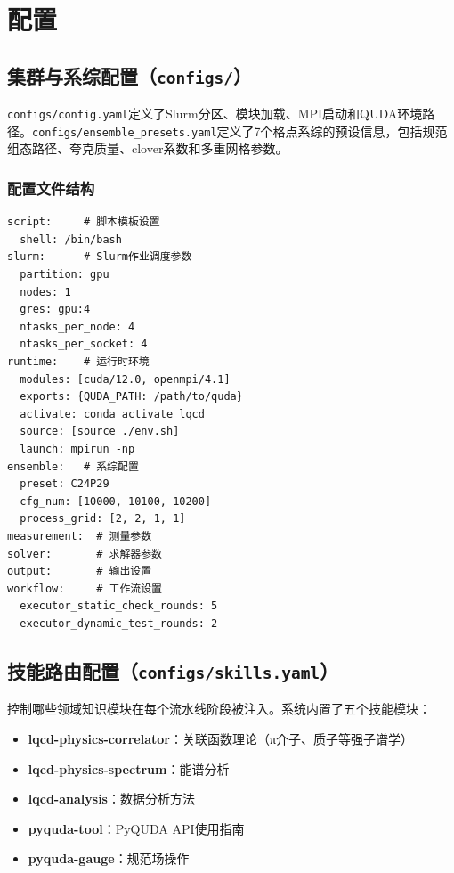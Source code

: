 \documentclass[12pt,a4paper]{ctexart}
\begin{document}
\section{配置}

\subsection{集群与系综配置（\texttt{configs/}）}

\texttt{configs/config.yaml}定义了Slurm分区、模块加载、MPI启动和QUDA环境路径。\texttt{configs/ensemble\_presets.yaml}定义了7个格点系综的预设信息，包括规范组态路径、夸克质量、clover系数和多重网格参数。

\subsubsection{配置文件结构}

\begin{lstlisting}[caption={configs/config.yaml 结构}, label={lst:config}]
script:     # 脚本模板设置
  shell: /bin/bash
slurm:      # Slurm作业调度参数
  partition: gpu
  nodes: 1
  gres: gpu:4
  ntasks_per_node: 4
  ntasks_per_socket: 4
runtime:    # 运行时环境
  modules: [cuda/12.0, openmpi/4.1]
  exports: {QUDA_PATH: /path/to/quda}
  activate: conda activate lqcd
  source: [source ./env.sh]
  launch: mpirun -np
ensemble:   # 系综配置
  preset: C24P29
  cfg_num: [10000, 10100, 10200]
  process_grid: [2, 2, 1, 1]
measurement:  # 测量参数
solver:       # 求解器参数
output:       # 输出设置
workflow:     # 工作流设置
  executor_static_check_rounds: 5
  executor_dynamic_test_rounds: 2
\end{lstlisting}

\subsection{技能路由配置（\texttt{configs/skills.yaml}）}

控制哪些领域知识模块在每个流水线阶段被注入。系统内置了五个技能模块：
\begin{itemize}[leftmargin=*]
    \item \textbf{lqcd-physics-correlator}：关联函数理论（π介子、质子等强子谱学）
    \item \textbf{lqcd-physics-spectrum}：能谱分析
    \item \textbf{lqcd-analysis}：数据分析方法
    \item \textbf{pyquda-tool}：PyQUDA API使用指南
    \item \textbf{pyquda-gauge}：规范场操作
\end{itemize}
\end{document}
